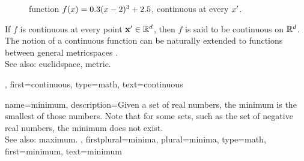 {{\begin{figure}[H]
		\caption{\Gls{function} $f(x) = 0.3(x-2)^3 + 2.5$, continuous 
		         at every $x'$.}
		\end{figure}
		If $f$ is continuous at every point ${\bf x}' \in \mathbb{R}^{d}$, then $f$ is said to be 
	 	continuous on $\mathbb{R}^{d}$. The notion of a continuous 
	 	\gls{function} can be naturally extended to \glspl{function} between general \glspl{metricspace} 
		\cite{RudinBookPrinciplesMatheAnalysis}.
		\\
		See also: \gls{euclidspace}, \gls{metric}.},
	first={continuous},
	type=math,
	text={continuous}
}

{name={minimum},
	description={Given a set of real numbers, the minimum is the smallest of those numbers.
		Note that for some sets, such as the set of negative real numbers, the minimum does not exist.
		\\
		See also: \gls{maximum}. },
	firstplural={minima}, 
 	plural={minima},
	type=math, 
	first={minimum},
	text={minimum}
}

